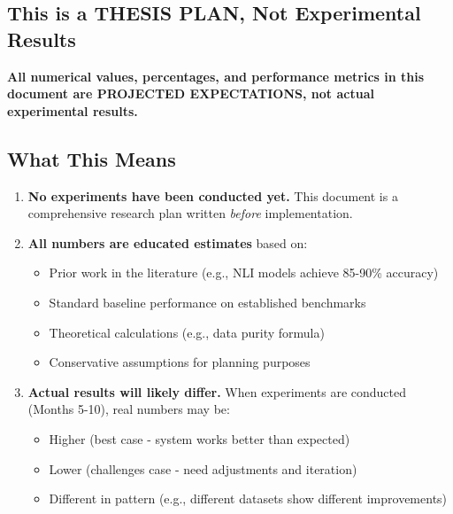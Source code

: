 \documentclass[12pt,a4paper]{article}
\theoremstyle{definition}
\begin{document}
\newpage

\begin{tcolorbox}[
    colback=yellow!10!white,
    colframe=orange!75!black,
    title={\Large\textbf{IMPORTANT: About the Numbers in This Document}},
    breakable,
    enhanced,
    fontupper=\normalsize
]

\section*{This is a THESIS PLAN, Not Experimental Results}

\textbf{All numerical values, percentages, and performance metrics in this document are PROJECTED EXPECTATIONS, not actual experimental results.}

\subsection*{What This Means}

\begin{enumerate}
    \item \textbf{No experiments have been conducted yet.} This document is a comprehensive research plan written \textit{before} implementation.
    
    \item \textbf{All numbers are educated estimates} based on:
    \begin{itemize}
        \item Prior work in the literature (e.g., NLI models achieve 85-90\% accuracy)
        \item Standard baseline performance on established benchmarks
        \item Theoretical calculations (e.g., data purity formula)
        \item Conservative assumptions for planning purposes
    \end{itemize}
    
    \item \textbf{Actual results will likely differ.} When experiments are conducted (Months 5-10), real numbers may be:
    \begin{itemize}
        \item Higher (best case - system works better than expected)
        \item Lower (challenges case - need adjustments and iteration)
        \item Different in pattern (e.g., different datasets show different improvements)
    \end{itemize}
    

\end{enumerate}
\end{tcolorbox}
\end{document}
